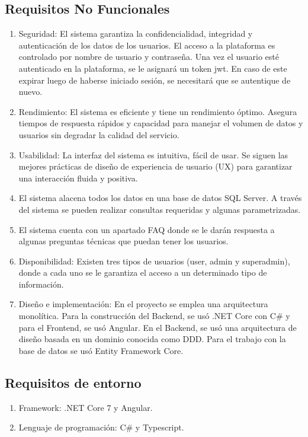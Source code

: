 \documentclass[15pt,a4paper]{article}
\begin{document}
\subsection*{Requisitos No Funcionales}

\begin{enumerate}
\item Seguridad: El sistema garantiza la confidencialidad, integridad y autenticación de 
los datos de los usuarios. El acceso a la plataforma es controlado por nombre de 
usuario y contraseña. Una vez el usuario esté autenticado en la plataforma, se le 
asignará un token jwt. En caso de este expirar luego de haberse iniciado sesión, 
se necesitará que se autentique de nuevo. 
\item  Rendimiento: El sistema es eficiente y tiene un rendimiento óptimo. Asegura 
tiempos de respuesta rápidos y capacidad para manejar el volumen de datos y
usuarios sin degradar la calidad del servicio. 
\item Usabilidad: La interfaz del sistema es intuitiva, fácil de usar. Se siguen las mejores 
prácticas de diseño de experiencia de usuario (UX) para garantizar una interacción 
fluida y positiva. 
\item El sistema alacena todos los datos en una base de datos SQL Server. A través del 
sistema se pueden realizar consultas requeridas y algunas parametrizadas. 
\item El sistema cuenta con un apartado FAQ donde se le darán respuesta a algunas 
preguntas técnicas que puedan tener los usuarios.
\item Disponibilidad: Existen tres tipos de usuarios (user, admin y superadmin), donde 
a cada uno se le garantiza el acceso a un determinado tipo de información.
\item Diseño e implementación: En el proyecto se emplea una arquitectura monolítica. 
Para la construcción del Backend, se usó .NET Core con C\# y para el Frontend, 
se usó Angular. En el Backend, se usó una arquitectura de diseño basada en un 
dominio conocida como DDD. Para el trabajo con la base de datos se usó Entity 
Framework Core.
\end{enumerate}

\subsection*{Requisitos de entorno}
\begin{enumerate}
\item Framework: .NET Core 7 y Angular.
\item Lenguaje de programación: C\# y Typescript.
\end{enumerate}
\end{document}
